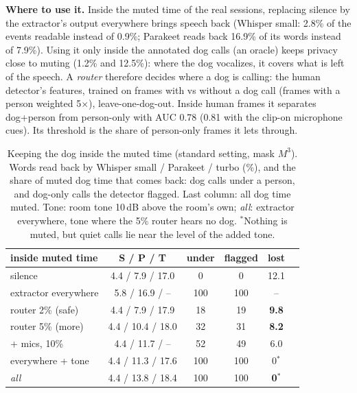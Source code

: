 \documentclass[10pt,twocolumn,a4paper]{article}
\begin{document}
\textbf{Where to use it.} Inside the muted time of the real sessions, replacing silence by the extractor's
output everywhere brings speech back (Whisper small: 2.8\% of the events readable instead of 0.9\%;
Parakeet reads back 16.9\% of its words instead of 7.9\%). Using it only inside the annotated dog calls
(an oracle) keeps privacy close to muting (1.2\% and 12.5\%): where the dog vocalizes, it covers what is
left of the speech. A \emph{router} therefore decides where a dog is calling: the human detector's
features, trained on frames with vs without a dog call (frames with a person weighted 5$\times$),
leave-one-dog-out. Inside human frames it separates dog+person from person-only with AUC 0.78 (0.81 with
the clip-on microphone cues). Its threshold is the share of person-only frames it lets through.

\begin{table}[t]
\centering\small
\caption{Keeping the dog inside the muted time (standard setting, mask $M^3$). Words read back by Whisper
small / Parakeet / turbo (\%), and the share of muted dog time that comes back: dog calls under a person,
and dog-only calls the detector flagged. Last column: all dog time muted. Tone: room tone 10\,dB above the room's own;
\emph{all}: extractor everywhere, tone where the 5\% router hears no dog. $^*$Nothing is muted, but
quiet calls lie near the level of the added tone.}
\label{tab:keep}
\setlength\tabcolsep{4pt}
\begin{tabular}{@{}lccccc@{}}
\toprule
inside muted time & S / P / T & under & flagged & lost\\
\midrule
silence & 4.4 / 7.9 / 17.0 & 0 & 0 & 12.1\\
extractor everywhere & 5.8 / 16.9 / -- & 100 & 100 & --\\
\midrule
router 2\% (safe) & 4.4 / 7.9 / 17.9 & 18 & 19 & \textbf{9.8}\\
router 5\% (more) & 4.4 / 10.4 / 18.0 & 32 & 31 & \textbf{8.2}\\
+ mics, 10\% & 4.4 / 11.7 / -- & 52 & 49 & 6.0\\
\midrule
everywhere + tone & 4.4 / 11.3 / 17.6 & 100 & 100 & 0$^*$\\
\emph{all} & 4.4 / 13.8 / 18.4 & 100 & 100 & \textbf{0}$^*$\\
\bottomrule
\end{tabular}
\end{table}
\end{document}
